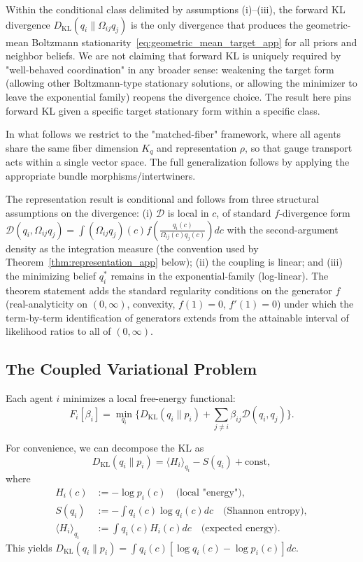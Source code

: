 \documentclass[11pt]{article}
\begin{document}
Within the conditional class delimited by assumptions (i)--(iii), the forward KL divergence $D_{\mathrm{KL}}(q_i \| \Omega_{ij} q_j)$ is the only divergence that produces the geometric-mean Boltzmann stationarity~\eqref{eq:geometric_mean_target_app} for all priors and neighbor beliefs. We are not claiming that forward KL is uniquely required by "well-behaved coordination" in any broader sense: weakening the target form (allowing other Boltzmann-type stationary solutions, or allowing the minimizer to leave the exponential family) reopens the divergence choice. The result here pins forward KL given a specific target stationary form within a specific class.

In what follows we restrict to the "matched-fiber" framework, where all agents share the same fiber dimension $K_q$ and representation $\rho$, so that gauge transport acts within a single vector space. The full generalization follows by applying the appropriate bundle morphisms/intertwiners.

The representation result is conditional and follows from three structural assumptions on the divergence: (i) $\mathcal{D}$ is local in $c$, of standard $f$-divergence form $\displaystyle \mathcal{D}(q_i, \Omega_{ij}q_j) = \int (\Omega_{ij}q_j)(c) f\left(\frac{q_i(c)}{\Omega_{ij}(c) q_j(c)}\right) dc$ with the second-argument density as the integration measure (the convention used by Theorem~\ref{thm:representation_app} below); (ii) the coupling is linear; and (iii) the minimizing belief $q_i^*$ remains in the exponential-family (log-linear). The theorem statement adds the standard regularity conditions on the generator $f$ (real-analyticity on $(0,\infty)$, convexity, $f(1)=0$, $f'(1)=0$) under which the term-by-term identification of generators extends from the attainable interval of likelihood ratios to all of $(0,\infty)$.

\subsection*{The Coupled Variational Problem}

Each agent $i$ minimizes a local free-energy functional:
\begin{equation}
F_i[\beta_i]
=\min_{q_i}
\Big\{
D_{\mathrm{KL}}(q_i \| p_i)
+ \sum_{j\neq i} \beta_{ij}\mathcal{D}(q_i,q_j)
\Big\}.
\label{eq:F_i_app}
\end{equation}

For convenience, we can decompose the KL as
\begin{equation}
D_{\mathrm{KL}}(q_i \| p_i) = \langle H_i \rangle_{q_i} - S(q_i) + \text{const},
\end{equation}
where
\begin{align}
H_i(c) &:= -\log p_i(c) \quad \text{(local "energy")}, \\
S(q_i) &:= -\int q_i(c) \log q_i(c)dc \quad \text{(Shannon entropy)}, \\
\langle H_i \rangle_{q_i} &:= \int q_i(c) H_i(c)dc \quad \text{(expected energy)}.
\end{align}
This yields $D_{\mathrm{KL}}(q_i \| p_i) = \int q_i(c)[\log q_i(c) - \log p_i(c)]dc$.
\end{document}
